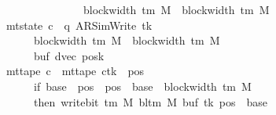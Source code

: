 \begin{isabellebody}
\ \ \ \ \ \ \ \ \ \ \ \ \ \ \ \ \ \ \ \ \ \ \ \ \ \ \ \ {\isacharcircum}{\kern0pt}{\isacharcircum}{\kern0pt}\ {\isacharparenleft}{\kern0pt}block{\isacharunderscore}{\kern0pt}width\ {\isacharparenleft}{\kern0pt}{\isasymGamma}{\isacharunderscore}{\kern0pt}tm\ M{\isacharparenright}{\kern0pt}\ {\isacharplus}{\kern0pt}\ {\isacharparenleft}{\kern0pt}block{\isacharunderscore}{\kern0pt}width\ {\isacharparenleft}{\kern0pt}{\isasymGamma}{\isacharunderscore}{\kern0pt}tm\ M{\isacharparenright}{\kern0pt}\ {\isacharminus}{\kern0pt}\ {}{\isacharparenright}{\kern0pt}{\isacharparenright}{\kern0pt}\isanewline
\ \ \ \ \ \ \ \ \ \ \ \ \ \ {\isasymand}\ mt{\isacharunderscore}{\kern0pt}state\ c{}\ {\isacharequal}{\kern0pt}\ {\isacharparenleft}{\kern0pt}q{\isacharcomma}{\kern0pt}\ AR{\isacharunderscore}{\kern0pt}SimWrite{\isacharcomma}{\kern0pt}\ tk{\isacharcomma}{\kern0pt}\isanewline
\ \ \ \ \ \ \ \ \ \ \ \ \ \ \ \ \ \ \ \ block{\isacharunderscore}{\kern0pt}width\ {\isacharparenleft}{\kern0pt}{\isasymGamma}{\isacharunderscore}{\kern0pt}tm\ M{\isacharparenright}{\kern0pt}\ {\isacharplus}{\kern0pt}\ {\isacharparenleft}{\kern0pt}block{\isacharunderscore}{\kern0pt}width\ {\isacharparenleft}{\kern0pt}{\isasymGamma}{\isacharunderscore}{\kern0pt}tm\ M{\isacharparenright}{\kern0pt}\ {\isacharminus}{\kern0pt}\ {}{\isacharparenright}{\kern0pt}{\isacharcomma}{\kern0pt}\isanewline
\ \ \ \ \ \ \ \ \ \ \ \ \ \ \ \ \ \ \ \ buf{\isacharcomma}{\kern0pt}\ dvec{\isacharcomma}{\kern0pt}\ posk{\isacharparenright}{\kern0pt}\isanewline
\ \ \ \ \ \ \ \ \ \ \ \ \ \ {\isasymand}\ mt{\isacharunderscore}{\kern0pt}tape\ c{}\ {\isacharequal}{\kern0pt}\ {\isacharparenleft}{\kern0pt}mt{\isacharunderscore}{\kern0pt}tape\ c{\isacharprime}{\kern0pt}{\isacharparenright}{\kern0pt}{\isacharparenleft}{\kern0pt}tk\ {\isacharcolon}{\kern0pt}{\isacharequal}{\kern0pt}\ {\isacharparenleft}{\kern0pt}{\isasymlambda}pos{\isachardot}{\kern0pt}\isanewline
\ \ \ \ \ \ \ \ \ \ \ \ \ \ \ \ \ \ \ \ if\ base\ {\isasymle}\ pos\ {\isasymand}\ pos\ {\isacharless}{\kern0pt}\ base\ {\isacharplus}{\kern0pt}\ {\isacharparenleft}{\kern0pt}block{\isacharunderscore}{\kern0pt}width\ {\isacharparenleft}{\kern0pt}{\isasymGamma}{\isacharunderscore}{\kern0pt}tm\ M{\isacharparenright}{\kern0pt}\ {\isacharminus}{\kern0pt}\ {}{\isacharparenright}{\kern0pt}\isanewline
\ \ \ \ \ \ \ \ \ \ \ \ \ \ \ \ \ \ \ \ then\ write{\isacharunderscore}{\kern0pt}bit\ {\isacharparenleft}{\kern0pt}{\isasymGamma}{\isacharunderscore}{\kern0pt}tm\ M{\isacharparenright}{\kern0pt}\ {\isacharparenleft}{\kern0pt}bl{\isacharunderscore}{\kern0pt}tm\ M{\isacharparenright}{\kern0pt}\ {\isacharparenleft}{\kern0pt}buf\ tk{\isacharparenright}{\kern0pt}\ {\isacharparenleft}{\kern0pt}pos\ {\isacharminus}{\kern0pt}\ base{\isacharparenright}{\kern0pt}\isanewline

\end{isabellebody}

